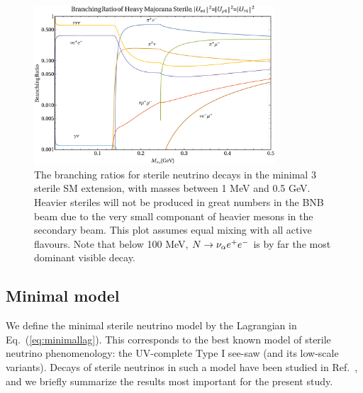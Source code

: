 \documentclass[11pt, a4paper]{article}
\newcommand{\refeq}[1]{Eq.~(\ref{#1})}
\newcommand{\refref}[1]{Ref.~\cite{#1}}
\def\ster{\ensuremath N}
\begin{document}
\begin{figure}[t]
%
\centering
%
\includegraphics[width=0.8\textwidth]{figures/bounds1.pdf}
%
%
\caption{\label{fig:branchingratios}The branching ratios for sterile neutrino
decays in the minimal 3 sterile SM extension, with masses between 1 MeV and 0.5
GeV. Heavier steriles will not be produced in great numbers in the BNB beam due
to the very small componant of heavier mesons in the secondary beam. This plot
assumes equal mixing with all active flavours. Note that below 100 MeV, $\ster
\rightarrow \nu_\alpha e^+ e^-$ is by far the most dominant visible decay.}
%
\end{figure}

\subsection{Minimal model}

We define the minimal sterile neutrino model by the Lagrangian in
\refeq{eq:minimallag}. This corresponds to the best known model of sterile
neutrino phenomenology: the UV-complete Type I see-saw (and its low-scale
variants). Decays of sterile neutrinos in such a model have been studied in
\refref{Atre:2009rg}, and we briefly summarize the results most important for
the present study.
\end{document}
